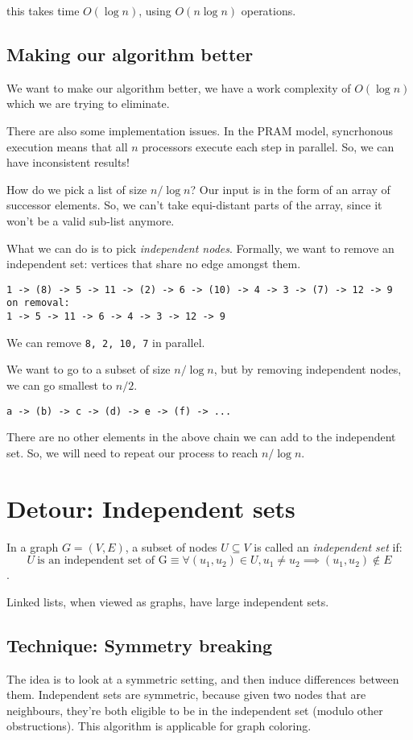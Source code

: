 this takes time $O(\log n)$, using $O(n \log n)$ operations.

\subsection{Making our algorithm better}
We want to make our algorithm better, we have a work complexity of $O(\log n)$
which we are trying to eliminate.

There are also some implementation issues. In the PRAM model, syncrhonous execution
means that all $n$ processors execute each step in parallel. So, we can have
inconsistent results!

How do we pick a list of size $n / \log n$? Our input is in the form of an array
of successor elements. So, we can't take equi-distant parts of the array,
since it won't be a valid sub-list anymore.


What we can do is to pick \textit{independent nodes}. Formally, we want
to remove an independent set: vertices that share no edge amongst them.

\begin{verbatim}
1 -> (8) -> 5 -> 11 -> (2) -> 6 -> (10) -> 4 -> 3 -> (7) -> 12 -> 9
on removal:
1 -> 5 -> 11 -> 6 -> 4 -> 3 -> 12 -> 9
\end{verbatim}
We can remove \texttt{8, 2, 10, 7} in parallel.

We want to go to a subset of size $n / \log n$, but by removing independent
nodes, we can go smallest to $n / 2$.

\begin{verbatim}
a -> (b) -> c -> (d) -> e -> (f) -> ...
\end{verbatim}
There are no other elements in the above chain we can add to the independent set.
So, we will need to repeat our process to reach $n / \log n$.

\section{Detour: Independent sets}
In a graph $G = (V, E)$, a subset of nodes $U \subseteq V$ is called an
\textit{independent set} if:
$$U~\text{is an independent set of G} \equiv \forall (u_1, u_2) \in U, u_1 \neq u_2 \implies (u_1, u_2) \notin E$$.

Linked lists, when viewed as graphs, have large independent sets.

\subsection{Technique: Symmetry breaking}
The idea is to look at a symmetric setting, and then induce differences
between them. Independent sets are symmetric, because given two nodes
that are neighbours, they're both eligible to be in the independent set 
(modulo other obstructions). This algorithm is applicable for graph coloring.

